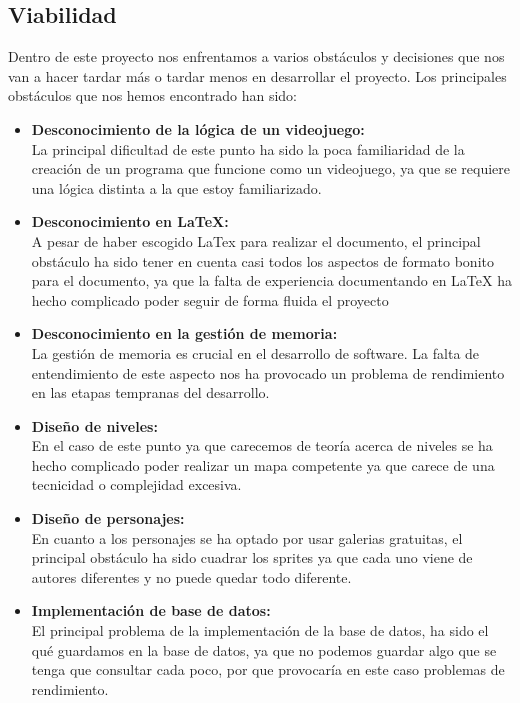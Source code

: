 \documentclass[a4paper]{article}
\begin{document}
\subsection{Viabilidad}
Dentro de este proyecto nos enfrentamos a varios obstáculos y decisiones que nos van a hacer tardar más o tardar menos en desarrollar el proyecto.
Los principales obstáculos que nos hemos encontrado han sido:
\begin{itemize}
    \item \textbf{Desconocimiento de la lógica de un videojuego:} \\
          La principal dificultad de este punto ha sido la poca familiaridad de la creación de un programa que funcione como un videojuego, ya que se requiere una lógica distinta a la que estoy familiarizado.

    \item \textbf{Desconocimiento en LaTeX:} \\
          A pesar de haber escogido LaTex para realizar el documento, el principal obstáculo ha sido tener en cuenta casi todos los aspectos de formato bonito para el documento, ya que la falta de experiencia
          documentando en LaTeX ha hecho complicado poder seguir de forma fluida el proyecto

    \item \textbf{Desconocimiento en la gestión de memoria:} \\
          La gestión de memoria es crucial en el desarrollo de software. La falta de entendimiento de este aspecto nos ha provocado un problema de rendimiento en las etapas tempranas del desarrollo.

    \item \textbf{Diseño de niveles:} \\
          En el caso de este punto ya que carecemos de teoría acerca de niveles se ha hecho complicado poder realizar un mapa competente ya que carece de una tecnicidad o complejidad excesiva.

    \item \textbf{Diseño de personajes:} \\
          En cuanto a los personajes se ha optado por usar galerias gratuitas, el principal obstáculo ha sido cuadrar los sprites ya que cada uno viene de autores diferentes y no puede quedar todo diferente.

    \item \textbf{Implementación de base de datos:} \\
          El principal problema de la implementación de la base de datos, ha sido el qué guardamos en la base de datos, ya que no podemos guardar algo que se tenga que consultar cada poco, por que provocaría
          en este caso problemas de rendimiento.


\end{itemize}
\end{document}
